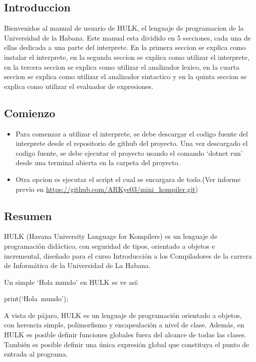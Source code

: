 \newcommand{\copiabletext}[2]{%
    \href{#2}{\texttt{#1}}%
}

\begin{center}
    \centering
    \section{Introduccion}
\end{center}
Bienvenidos al manual de usuario de HULK, el lenguaje de programacion de la Universidad de la Habana. Este manual esta dividido en 5 secciones, cada una de ellas dedicada a una parte del interprete. En la primera seccion se explica como instalar el interprete, en la segunda seccion se explica como utilizar el interprete, en la tercera seccion se explica como utilizar el analizador lexico, en la cuarta seccion se explica como utilizar el analizador sintactico y en la quinta seccion se explica como utilizar el evaluador de expresiones.

\subsection{Comienzo}
    \begin{itemize}
        \item Para comenzar a utilizar el interprete, se debe descargar el codigo fuente del interprete desde el repositorio de github del proyecto. Una vez descargado el codigo fuente, se debe ejecutar el proyecto usando el comando `dotnet run' desde una terminal abierta en la carpeta del proyecto.
        \item Otra opcion es ejecutar el script el cual se encargara de todo.(Ver informe previo en \url{https://github.com/ARKye03/mini_kompiler.git})
    \end{itemize}
    
\subsection{Resumen}
    HULK (Havana University Language for Kompilers) es un lenguaje de programación didáctico, con seguridad de tipos, orientado a objetos e incremental, diseñado para el curso Introducción a los Compiladores de la carrera de Informática de la Universidad de La Habana.

    Un simple `Hola mundo' en HULK se ve así:

    \hbox{print(`Hola mundo');}

    A vista de pájaro, HULK es un lenguaje de programación orientado a objetos, con herencia simple, polimorfismo y encapsulación a nivel de clase. Además, en HULK es posible definir funciones globales fuera del alcance de todas las clases. También es posible definir una única expresión global que constituya el punto de entrada al programa.

